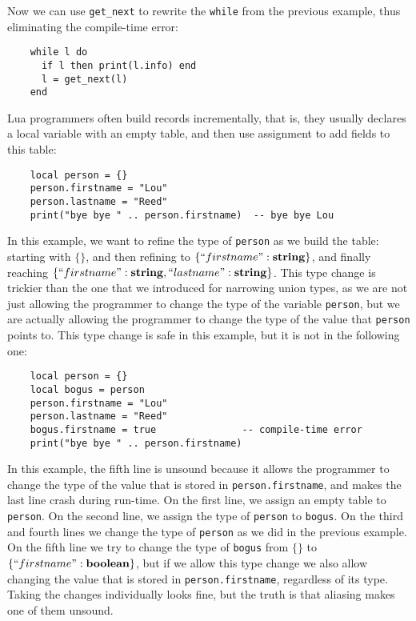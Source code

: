 Now we can use \texttt{get\string_next} to rewrite the \texttt{while}
from the previous example, thus eliminating the compile-time error:
\begin{verbatim}
    while l do
      if l then print(l.info) end
      l = get_next(l)
    end
\end{verbatim}

Lua programmers often build records incrementally, that is,
they usually declares a local variable with an empty table,
and then use assignment to add fields to this table:
\begin{verbatim}
    local person = {}
    person.firstname = "Lou"
    person.lastname = "Reed"
    print("bye bye " .. person.firstname)  -- bye bye Lou
\end{verbatim}

In this example, we want to refine the type of \texttt{person} as
we build the table:
starting with $\{\}$, and then refining to $\{``firstname":\mathbf{string}\}$,
and finally reaching $\{``firstname":\mathbf{string}, ``lastname":\mathbf{string}\}$.
This type change is trickier than the one that we introduced for narrowing
union types, as we are not just allowing the programmer to change
the type of the variable \texttt{person}, but we are actually allowing
the programmer to change the type of the value that \texttt{person} points to.
This type change is safe in this example, but it is not in the following one:
\begin{verbatim}
    local person = {}
    local bogus = person
    person.firstname = "Lou"
    person.lastname = "Reed"
    bogus.firstname = true               -- compile-time error
    print("bye bye " .. person.firstname)
\end{verbatim}

In this example, the fifth line is unsound because it allows the
programmer to change the type of the value that is stored in
\texttt{person.firstname}, and makes the last line crash during
run-time.
On the first line, we assign an empty table to \texttt{person}.
On the second line, we assign the type of \texttt{person} to
\texttt{bogus}.
On the third and fourth lines we change the type of \texttt{person}
as we did in the previous example.
On the fifth line we try to change the type of \texttt{bogus}
from $\{\}$ to $\{``firstname":\mathbf{boolean}\}$, but if we allow this
type change we also allow changing the value that is stored in
\texttt{person.firstname}, regardless of its type.
Taking the changes individually looks fine, but the truth is that
aliasing makes one of them unsound.

